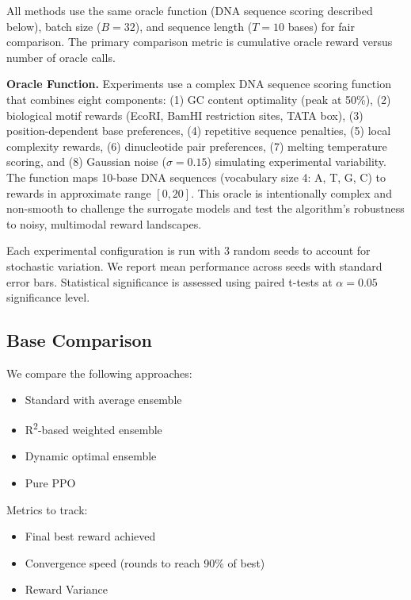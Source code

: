 \documentclass[conference]{IEEEtran}
\begin{document}
All methods use the same oracle function (DNA sequence scoring described below), batch size ($B = 32$), and sequence length ($T = 10$ bases) for fair comparison. The primary comparison metric is cumulative oracle reward versus number of oracle calls.

\textbf{Oracle Function.} Experiments use a complex DNA sequence scoring function that combines eight components: (1) GC content optimality (peak at 50\%), (2) biological motif rewards (EcoRI, BamHI restriction sites, TATA box), (3) position-dependent base preferences, (4) repetitive sequence penalties, (5) local complexity rewards, (6) dinucleotide pair preferences, (7) melting temperature scoring, and (8) Gaussian noise ($\sigma = 0.15$) simulating experimental variability. The function maps 10-base DNA sequences (vocabulary size 4: A, T, G, C) to rewards in approximate range $[0, 20]$. This oracle is intentionally complex and non-smooth to challenge the surrogate models and test the algorithm's robustness to noisy, multimodal reward landscapes.

Each experimental configuration is run with 3 random seeds to account for stochastic variation. We report mean performance across seeds with standard error bars. Statistical significance is assessed using paired t-tests at $\alpha = 0.05$ significance level.















\subsection{Base Comparison}
We compare the following approaches:
\begin{itemize}
    \item Standard with average ensemble
    \item R\textsuperscript{2}-based weighted ensemble
    \item Dynamic optimal ensemble
    \item Pure PPO
\end{itemize}

Metrics to track:
\begin{itemize}
    \item Final best reward achieved
    \item Convergence speed (rounds to reach 90\% of best)
    \item Reward Variance
\end{itemize}
\end{document}
